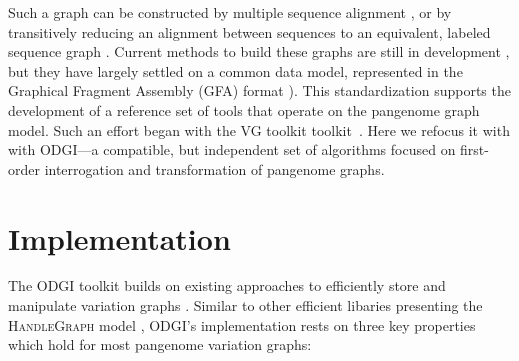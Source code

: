 \documentclass{bioinfo}
\newcommand{\red}[1]{{\textcolor{Red}{#1}}}
\newcommand{\FIXME}[1]{\red{[FIXME: #1]}}
\begin{document}
Such a graph can be constructed by multiple sequence alignment \citep{Lee_2002,Grasso_2004}, or by transitively reducing an alignment between sequences to an equivalent, labeled sequence graph \citep{Kehr_2014,Garrison_2019_thesis}.
Current methods to build these graphs are still in development \citep{Li:2020,Armstrong:2020,pggb}, but they have largely settled on a common data model, represented in the Graphical Fragment Assembly (GFA) format \citep{GFA}).
This standardization supports the development of a reference set of tools that operate on the pangenome graph model.
Such an effort began with the VG toolkit toolkit~\citep{Garrison:2018}.
Here we refocus it with with ODGI---a compatible, but independent set of algorithms focused on first-order interrogation and transformation of pangenome graphs.





\section{Implementation}

The ODGI toolkit builds on existing approaches to efficiently store and manipulate variation graphs \citep{Garrison:2018}.
Similar to other efficient libaries presenting the \textsc{HandleGraph} model \citep{Eizenga_2020_BX}, ODGI's implementation rests on three key properties which hold for most pangenome variation graphs:
\end{document}
